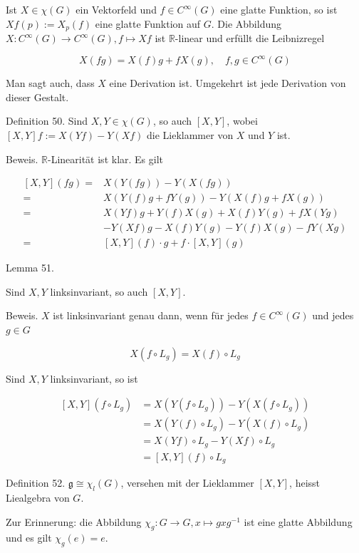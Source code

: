 \documentclass[10pt, letterpaper]{article}
\begin{document}
Ist $X \in \chi(G)$ ein Vektorfeld und $f \in C^{\infty}(G)$ eine glatte Funktion, so ist $X f(p):=X_{p}(f)$ eine glatte Funktion auf $G$. Die Abbildung $X: C^{\infty}(G) \rightarrow C^{\infty}(G), f \mapsto X f$ ist $\mathbb{R}$-linear und erfüllt die Leibnizregel

$$
X(f g)=X(f) g+f X(g), \quad f, g \in C^{\infty}(G)
$$

Man sagt auch, dass $X$ eine Derivation ist. Umgekehrt ist jede Derivation von dieser Gestalt.

Definition 50. Sind $X, Y \in \chi(G)$, so auch $[X, Y]$, wobei $[X, Y] f:= X(Y f)-Y(X f)$ die Lieklammer von $X$ und $Y$ ist.

Beweis. $\mathbb{R}$-Linearität ist klar. Es gilt

$$
\begin{aligned}
{[X, Y](f g)=} & X(Y(f g))-Y(X(f g)) \\
= & X(Y(f) g+f Y(g))-Y(X(f) g+f X(g)) \\
= & X(Y f) g+Y(f) X(g)+X(f) Y(g)+f X(Y g) \\
& -Y(X f) g-X(f) Y(g)-Y(f) X(g)-f Y(X g) \\
= & {[X, Y](f) \cdot g+f \cdot[X, Y](g) }
\end{aligned}
$$


Lemma 51. 

Sind $X, Y$ linksinvariant, so auch $[X, Y]$.

Beweis. $X$ ist linksinvariant genau dann, wenn für jedes $f \in C^{\infty}(G)$ und jedes $g \in G$

$$
X\left(f \circ L_{g}\right)=X(f) \circ L_{g}
$$

Sind $X, Y$ linksinvariant, so ist

$$
\begin{aligned}
{[X, Y]\left(f \circ L_{g}\right) } & =X\left(Y\left(f \circ L_{g}\right)\right)-Y\left(X\left(f \circ L_{g}\right)\right) \\
& =X\left(Y(f) \circ L_{g}\right)-Y\left(X(f) \circ L_{g}\right) \\
& =X(Y f) \circ L_{g}-Y(X f) \circ L_{g} \\
& =[X, Y](f) \circ L_{g}
\end{aligned}
$$

Definition 52. $\mathfrak{g} \cong \chi_{l}(G)$, versehen mit der Lieklammer $[X, Y]$, heisst Liealgebra von $G$.

Zur Erinnerung: die Abbildung $\chi_{g}: G \rightarrow G, x \mapsto g x g^{-1}$ ist eine glatte Abbildung und es gilt $\chi_{g}(e)=e$.
\end{document}

